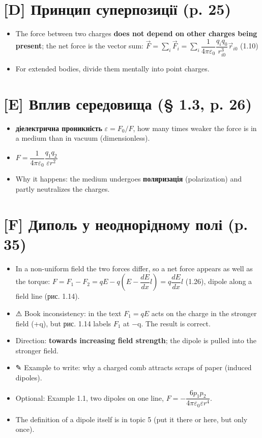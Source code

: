 \documentclass[11pt,a4paper,oneside]{book}
\newcommand{\pen}{{\sffamily\color{accent}✎}}
\newcommand{\warn}{{\sffamily\color{warncol}⚠}}
\begin{document}
\section*{[D] Принцип суперпозиції (p. 25)}
\begin{itemize}
\item The force between two charges \textbf{does not depend on other charges being present}; the net force is the vector sum:
$\vec F = \sum_i \vec F_i = \sum_i \dfrac{1}{4\pi\varepsilon_0}\dfrac{q_iq_0}{r_{i0}^3}\vec r_{i0}$ (1.10)
\item For extended bodies, divide them mentally into point charges.
\end{itemize}

\section*{[E] Вплив середовища (§ 1.3, p. 26)}
\begin{itemize}
\item \textbf{діелектрична проникність} $\varepsilon = F_0/F$, how many times weaker the force is in a medium than in vacuum (dimensionless).
\item $F = \dfrac{1}{4\pi\varepsilon_0}\dfrac{q_1q_2}{\varepsilon r^2}$
\item Why it happens: the medium undergoes \textbf{поляризація} (polarization) and partly neutralizes the charges.
\end{itemize}

\section*{[F] Диполь у неоднорідному полі (p. 35)}
\begin{itemize}
\item In a non-uniform field the two forces differ, so a net force appears as well as the torque:
$F = F_1 - F_2 = qE - q\left(E - \dfrac{dE}{dx}l\right) = q\dfrac{dE}{dx}l$ (1.26), dipole along a field line (рис. 1.14).
\item \warn{} Book inconsistency: in the text $F_1 = qE$ acts on the charge in the stronger field (+q), but рис. 1.14 labels $F_1$ at −q. The result is correct.
\item Direction: \textbf{towards increasing field strength}; the dipole is pulled into the stronger field.
\item \pen{} Example to write: why a charged comb attracts scraps of paper (induced dipoles).
\item Optional: Example 1.1, two dipoles on one line, $F = -\dfrac{6p_1p_2}{4\pi\varepsilon_0\varepsilon r^4}$.
\item The definition of a dipole itself is in topic 5 (put it there or here, but only once).
\end{itemize}
\end{document}
